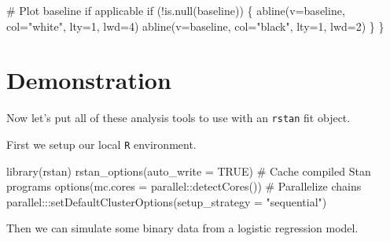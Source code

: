 \documentclass[
  letterpaper,
  DIV=11,
  numbers=noendperiod]{scrartcl}
\newenvironment{Shaded}{\begin{snugshade}}{\end{snugshade}}
\newcommand{\AttributeTok}[1]{\textcolor[rgb]{0.40,0.45,0.13}{#1}}
\newcommand{\CommentTok}[1]{\textcolor[rgb]{0.37,0.37,0.37}{#1}}
\newcommand{\ConstantTok}[1]{\textcolor[rgb]{0.56,0.35,0.01}{#1}}
\newcommand{\ControlFlowTok}[1]{\textcolor[rgb]{0.00,0.23,0.31}{#1}}
\newcommand{\DecValTok}[1]{\textcolor[rgb]{0.68,0.00,0.00}{#1}}
\newcommand{\FunctionTok}[1]{\textcolor[rgb]{0.28,0.35,0.67}{#1}}
\newcommand{\NormalTok}[1]{\textcolor[rgb]{0.00,0.23,0.31}{#1}}
\newcommand{\SpecialCharTok}[1]{\textcolor[rgb]{0.37,0.37,0.37}{#1}}
\newcommand{\StringTok}[1]{\textcolor[rgb]{0.13,0.47,0.30}{#1}}
\begin{document}
\begin{Shaded}
\begin{Highlighting}[]
  \CommentTok{\# Plot baseline if applicable}
  \ControlFlowTok{if}\NormalTok{ (}\SpecialCharTok{!}\FunctionTok{is.null}\NormalTok{(baseline)) \{}
    \FunctionTok{abline}\NormalTok{(}\AttributeTok{v=}\NormalTok{baseline, }\AttributeTok{col=}\StringTok{"white"}\NormalTok{, }\AttributeTok{lty=}\DecValTok{1}\NormalTok{, }\AttributeTok{lwd=}\DecValTok{4}\NormalTok{)}
    \FunctionTok{abline}\NormalTok{(}\AttributeTok{v=}\NormalTok{baseline, }\AttributeTok{col=}\StringTok{"black"}\NormalTok{, }\AttributeTok{lty=}\DecValTok{1}\NormalTok{, }\AttributeTok{lwd=}\DecValTok{2}\NormalTok{)}
\NormalTok{  \}}
\NormalTok{\}}
\end{Highlighting}
\end{Shaded}

\hypertarget{demonstration}{%
\section{Demonstration}\label{demonstration}}

Now let's put all of these analysis tools to use with an \texttt{rstan}
fit object.

First we setup our local \texttt{R} environment.

\begin{Shaded}
\begin{Highlighting}[]
\FunctionTok{library}\NormalTok{(rstan)}
\FunctionTok{rstan\_options}\NormalTok{(}\AttributeTok{auto\_write =} \ConstantTok{TRUE}\NormalTok{)            }\CommentTok{\# Cache compiled Stan programs}
\FunctionTok{options}\NormalTok{(}\AttributeTok{mc.cores =}\NormalTok{ parallel}\SpecialCharTok{::}\FunctionTok{detectCores}\NormalTok{()) }\CommentTok{\# Parallelize chains}
\NormalTok{parallel}\SpecialCharTok{:::}\FunctionTok{setDefaultClusterOptions}\NormalTok{(}\AttributeTok{setup\_strategy =} \StringTok{"sequential"}\NormalTok{)}
\end{Highlighting}
\end{Shaded}

Then we can simulate some binary data from a logistic regression model.
\end{document}
